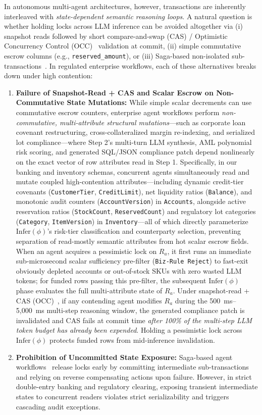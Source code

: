 \documentclass[conference,10pt]{IEEEtran}
\begin{document}
In autonomous multi-agent architectures, however, transactions are inherently interleaved with \textit{state-dependent semantic reasoning loops}. A natural question is whether holding locks across LLM inference can be avoided altogether via (i) snapshot reads followed by short compare-and-swap (CAS) / Optimistic Concurrency Control (OCC)~\cite{kung1981optimistic} validation at commit, (ii) simple commutative escrow columns (e.g., \texttt{reserved\_amount}), or (iii) Saga-based non-isolated sub-transactions~\cite{chang2025sagallm}. In regulated enterprise workflows, each of these alternatives breaks down under high contention:
\begin{enumerate}
    \item \textbf{Failure of Snapshot-Read + CAS and Scalar Escrow on Non-Commutative State Mutations:} While simple scalar decrements can use commutative escrow counters, enterprise agent workflows perform \textit{non-commutative, multi-attribute structural mutations}---such as corporate loan covenant restructuring, cross-collateralized margin re-indexing, and serialized lot compliance---where Step 2's multi-turn LLM synthesis, AML polynomial risk scoring, and generated SQL/JSON compliance patch depend nonlinearly on the exact vector of row attributes read in Step 1. Specifically, in our banking and inventory schemas, concurrent agents simultaneously read and mutate coupled high-contention attributes---including dynamic credit-tier covenants (\texttt{CustomerTier}, \texttt{CreditLimit}), net liquidity ratios (\texttt{Balance}), and monotonic audit counters (\texttt{AccountVersion}) in \texttt{Accounts}, alongside active reservation ratios (\texttt{StockCount}, \texttt{ReservedCount}) and regulatory lot categories (\texttt{Category}, \texttt{ItemVersion}) in \texttt{Inventory}---all of which directly parameterize $\text{Infer}(\phi)$'s risk-tier classification and counterparty selection, preventing separation of read-mostly semantic attributes from hot scalar escrow fields. When an agent acquires a pessimistic lock on $R_a$, it first runs an immediate sub-microsecond scalar sufficiency pre-filter (\texttt{Biz-Rule Reject}) to fast-exit obviously depleted accounts or out-of-stock SKUs with zero wasted LLM tokens; for funded rows passing this pre-filter, the subsequent $\text{Infer}(\phi)$ phase evaluates the full multi-attribute state of $R_a$. Under snapshot-read + CAS (OCC)~\cite{kung1981optimistic}, if any contending agent modifies $R_a$ during the 500~ms--5,000~ms multi-step reasoning window, the generated compliance patch is invalidated and CAS fails at commit time \textit{after 100\% of the multi-step LLM token budget has already been expended}. Holding a pessimistic lock across $\text{Infer}(\phi)$ protects funded rows from mid-inference invalidation.
    \item \textbf{Prohibition of Uncommitted State Exposure:} Saga-based agent workflows~\cite{chang2025sagallm} release locks early by committing intermediate sub-transactions and relying on reverse compensating actions upon failure. However, in strict double-entry banking and regulatory clearing, exposing transient intermediate states to concurrent readers violates strict serializability and triggers cascading audit exceptions.
\end{enumerate}
\end{document}
